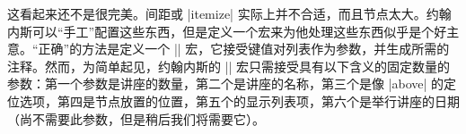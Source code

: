 
这看起来还不是很完美。间距或 |{itemize}| 实际上并不合适，而且节点太大。约翰内斯可以``手工''配置这些东西，但是定义一个宏来为他处理这些东西似乎是个好主意。``正确''的方法是定义一个 |\lecture| 宏，它接受键值对列表作为参数，并生成所需的注释。然而，为简单起见，约翰内斯的 |\lecture| 宏只需接受具有以下含义的固定数量的参数：第一个参数是讲座的数量，第二个是讲座的名称，第三个是像 |above| 的定位选项，第四是节点放置的位置，第五个的显示列表项，第六个是举行讲座的日期（尚不需要此参数，但是稍后我们将需要它）。

%
\begin{codeexample}
\def\lecture#1#2#3#4#5#6{
  \node [annotation, #3, scale=0.65, text width=4cm, inner sep=2mm] at (#4) {
    Lecture #1: \textcolor{orange}{\textbf{#2}}
    \list{--}{\topsep=2pt\itemsep=0pt\parsep=0pt
              \parskip=0pt\labelwidth=8pt\leftmargin=8pt
              \itemindent=0pt\labelsep=2pt}
    #5
    \endlist
  };
}
\end{codeexample}
\def\lecture#1#2#3#4#5#6{
  \node [annotation, #3, scale=0.65, text width=4cm, inner sep=2mm] at (#4) {
    Lecture #1: \textcolor{orange}{\textbf{#2}}
    \list{--}{\topsep=2pt\itemsep=0pt\parsep=0pt
              \parskip=0pt\labelwidth=8pt\leftmargin=8pt
              \itemindent=0pt\labelsep=2pt}
    #5
    \endlist
  };
}

